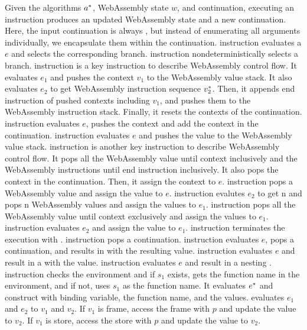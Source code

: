 Given the algorithms $a^*$, WebAssembly state $w$, and continuation,
executing an instruction produces an updated WebAssembly state and a new
continuation.
Here, the input continuation is always \algo{}, but instead of enumerating all
arguments individually, we encapsulate them within the \algo{} continuation.
\ifi{} instruction evaluates a $e$ and selects the corresponding branch.
\eitheri{} instruction nondeterministically selects a branch.
\enteri{} instruction is a key instruction to describe WebAssembly control flow.
It evaluates $e_1$ and pushes the context $v_1$ to the WebAssembly value stack.
It also evaluates $e_2$ to get WebAssembly instruction sequence $v_2^*$.
Then, it appends end instruction of pushed contexts including $v_1$, and pushes
them to the WebAssembly instruction stack.
Finally, it resets the contexts of the continuation.
\pushctxi{} instruction evaluates $e$, pushes the context and add the context
in the continuation.
\pushi{} instruction evaluates $e$ and pushes the value to the WebAssembly
value stack.
\popctxi{} instruction is another key instruction to describe WebAssembly
control flow.
It pops all the WebAssembly value until context inclusively and the WebAssembly
instructions until end instruction inclusively.
It also pops the context in the continuation.
Then, it assign the context to $e$.
\popi{} instruction pops a WebAssembly value and assign the value to $e$.
\popn{} instruction evalutes $e_2$ to get n and pops n WebAssembly values and
assign the values to $e_1$.
\popalli{} instruction pops all the WebAssembly value until context exclusively
and assign the values to $e_1$.
 instruction evaluates $e_2$ and assign the value to $e_1$.
\trapi{} instruction terminates the execution with \trapv{}.
\returnreli{} instruction pops a continuation.
\returnfunci{} instruction evaluates $e$, pops a continuation, and results in
\ret{} with the resulting value.
\executei{} instruction evaluates $e$ and result in a \exe{} with the value.
\executeseqi{} instruction evaluates $e$ and result in a nesting \exe{}.
\calli{} instruction checks the environment and if $s_1$ exists, gets the
function name in the environment, and if not, uses $s_1$ as the function name.
It evaluates $e^*$ and construct \call{} with binding variable, the function
name, and the values.
\replacei{} evaluates $e_1$ and $e_2$ to $v_1$ and $v_2$.
If $v_1$ is frame, access the frame with $p$ and update the value to $v_2$.
If $v_1$ is store, access the store with $p$ and update the value to $v_2$.




